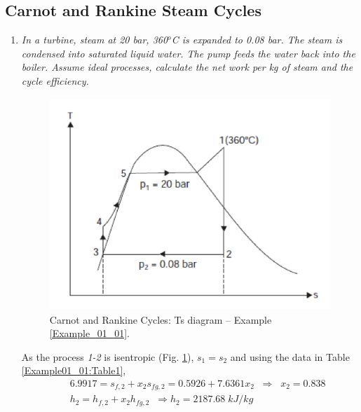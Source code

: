 
\pagebreak

\subsection{Carnot and Rankine Steam Cycles}


\begin{enumerate}

\item {\it In a turbine, steam at 20 bar, 360$^{o}$C is expanded to 0.08 bar. The steam is condensed into saturated liquid water. The pump feeds the water back into the boiler. Assume ideal processes, calculate the net work per kg of steam and the cycle efficiency.}\label{Example_01_01}

\begin{figure}[h]
\begin{center}
\includegraphics[width=13.0cm,height=8.0cm]{./../../ThermalEngines/Pics/example01_01}
\end{center}
\caption{Carnot and Rankine Cycles: Ts diagram -- Example \ref{Example_01_01}.}
\label{Example01_01:Pic1}
\end{figure}

As the process {\it 1-2} is isentropic (Fig. \ref{Example01_01:Pic1}), $s_{1}=s_{2}$ and using the data in Table \ref{Example01_01:Table1},
\begin{eqnarray}
&& 6.9917 = s_{f,2}+x_{2}s_{fg,2} = 0.5926 + 7.6361 x_{2} \;\; \Longrightarrow \;\; x_{2}= 0.838 \nonumber \\
&& h_{2} = h_{f,2}+ x_{2}h_{fg,2} \;\; \Longrightarrow h_{2}=2187.68\;kJ/kg \nonumber
\end{eqnarray}


\end{enumerate}
